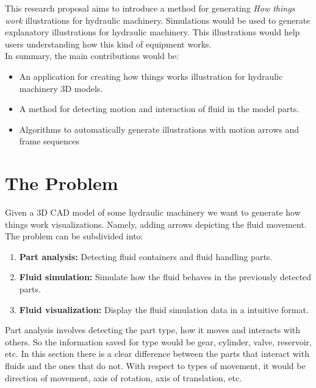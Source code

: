 \documentclass[11pt]{report}
\begin{document}
This research proposal aims to introduce a method for generating \textit{How things work} illustrations for hydraulic machinery.
Simulations would be used to generate explanatory illustrations for hydraulic machinery.
This illustrations would help users understanding how this kind of equipment works.\\

In summary, the main contributions would be:
\begin{itemize}
\item An application for creating how things works illustration for hydraulic machinery 3D models.
\item A method for detecting motion and interaction of fluid in the model parts.
\item Algorithms to automatically generate illustrations with motion arrows and frame sequences
\end{itemize}


\chapter{The Problem}
\label{sec:problem}

Given a 3D CAD model of some hydraulic machinery we want to generate how things work visualizations.
Namely, adding arrows depicting the fluid movement.\\

The problem can be subdivided into:
\begin{enumerate}
\item \textbf{Part analysis:} Detecting fluid containers and fluid handling parts.
\item \textbf{Fluid simulation:} Simulate how the fluid behaves in the previously detected parts.
\item \textbf{Fluid visualization:} Display the fluid simulation data in a intuitive format.\\
\end{enumerate}

Part analysis involves detecting the part type, how it moves and interacts with others.
So the information saved for type would be gear, cylinder, valve, reservoir, etc.
In this section there is a clear difference between the parts that interact with fluids and the ones that do not. 
With respect to types of movement, it would be direction of movement, axis of rotation, axis of translation, etc.\\
\end{document}
